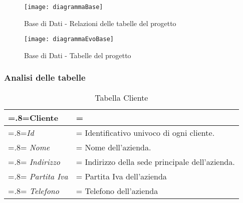 \begin{figure}[H]
\bigskip
\bigskip
\bigskip
\bigskip
    \centering 
    \texttt{[image: diagrammaBase]} 
    \bigskip
    \caption{Base di Dati - Relazioni delle tabelle del progetto}
\end{figure}

\newpage

\begin{figure}[H]
\bigskip
\bigskip
\bigskip
\bigskip
\bigskip
    \centering 
    \texttt{[image: diagrammaEvoBase]} 
    \bigskip
    \caption{Base di Dati - Tabelle del progetto}
\end{figure}
\newpage

\subsubsection*{Analisi delle tabelle}
            \begin{table}[H]
                \centering
                \renewcommand{\arraystretch}{1.8}
                \renewcommand\tabularxcolumn[1]{m{#1}}
                \begin{tabularx}{0.9\textwidth} {
                    >{\hsize=.8\hsize\linewidth=\hsize}X
                    >{\hsize=1.2\hsize\linewidth=\hsize}X}
                    \textbf{Cliente}\\
                    \hline
                    \textit{Id} & Identificativo univoco di ogni cliente. \\
                    \hline
                    \textit{Nome} & Nome dell'azienda.  \\
                    \hline
                    \textit{Indirizzo} & Indirizzo della sede principale dell'azienda. \\
                    \hline
                    \textit{Partita Iva} & Partita Iva dell'azienda \\
                    \hline
   	                \textit{Telefono} & Telefono dell'azienda \\
                    \hline
                \end{tabularx}
                \smallskip
                \caption{Tabella Cliente}
            \end{table}
            \smallskip
